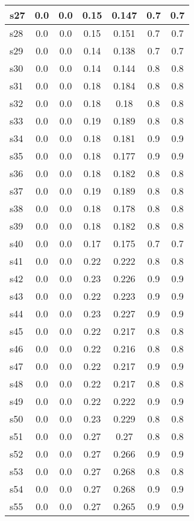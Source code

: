 \documentclass{article}
\begin{document}
\begin{tabular}{|l|c|c|c|c|c|c|}
s27 &0.0 & 0.0 & 0.15 & 0.147 & 0.7 & 0.7\\
\hline
s28 &0.0 & 0.0 & 0.15 & 0.151 & 0.7 & 0.7\\
\hline
s29 &0.0 & 0.0 & 0.14 & 0.138 & 0.7 & 0.7\\
\hline
s30 &0.0 & 0.0 & 0.14 & 0.144 & 0.8 & 0.8\\
\hline
s31 &0.0 & 0.0 & 0.18 & 0.184 & 0.8 & 0.8\\
\hline
s32 &0.0 & 0.0 & 0.18 & 0.18 & 0.8 & 0.8\\
\hline
s33 &0.0 & 0.0 & 0.19 & 0.189 & 0.8 & 0.8\\
\hline
s34 &0.0 & 0.0 & 0.18 & 0.181 & 0.9 & 0.9\\
\hline
s35 &0.0 & 0.0 & 0.18 & 0.177 & 0.9 & 0.9\\
\hline
s36 &0.0 & 0.0 & 0.18 & 0.182 & 0.8 & 0.8\\
\hline
s37 &0.0 & 0.0 & 0.19 & 0.189 & 0.8 & 0.8\\
\hline
s38 &0.0 & 0.0 & 0.18 & 0.178 & 0.8 & 0.8\\
\hline
s39 &0.0 & 0.0 & 0.18 & 0.182 & 0.8 & 0.8\\
\hline
s40 &0.0 & 0.0 & 0.17 & 0.175 & 0.7 & 0.7\\
\hline
s41 &0.0 & 0.0 & 0.22 & 0.222 & 0.8 & 0.8\\
\hline
s42 &0.0 & 0.0 & 0.23 & 0.226 & 0.9 & 0.9\\
\hline
s43 &0.0 & 0.0 & 0.22 & 0.223 & 0.9 & 0.9\\
\hline
s44 &0.0 & 0.0 & 0.23 & 0.227 & 0.9 & 0.9\\
\hline
s45 &0.0 & 0.0 & 0.22 & 0.217 & 0.8 & 0.8\\
\hline
s46 &0.0 & 0.0 & 0.22 & 0.216 & 0.8 & 0.8\\
\hline
s47 &0.0 & 0.0 & 0.22 & 0.217 & 0.9 & 0.9\\
\hline
s48 &0.0 & 0.0 & 0.22 & 0.217 & 0.8 & 0.8\\
\hline
s49 &0.0 & 0.0 & 0.22 & 0.222 & 0.9 & 0.9\\
\hline
s50 &0.0 & 0.0 & 0.23 & 0.229 & 0.8 & 0.8\\
\hline
s51 &0.0 & 0.0 & 0.27 & 0.27 & 0.8 & 0.8\\
\hline
s52 &0.0 & 0.0 & 0.27 & 0.266 & 0.9 & 0.9\\
\hline
s53 &0.0 & 0.0 & 0.27 & 0.268 & 0.8 & 0.8\\
\hline
s54 &0.0 & 0.0 & 0.27 & 0.268 & 0.9 & 0.9\\
\hline
s55 &0.0 & 0.0 & 0.27 & 0.265 & 0.9 & 0.9\\

\end{tabular}
\end{document}
